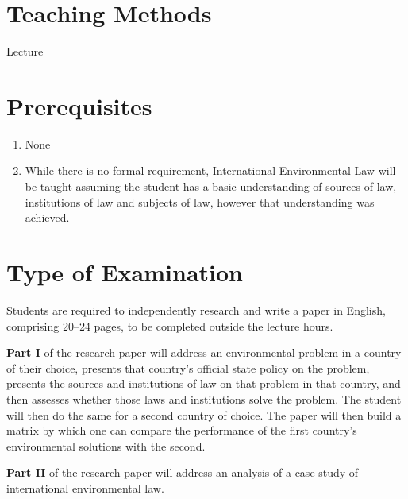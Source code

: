 \documentclass[
  letterpaper,
  10pt,
  openany]{book}
\providecommand{\tightlist}{%
  \setlength{\itemsep}{0pt}\setlength{\parskip}{0pt}}\usepackage{longtable,booktabs,array}
\begin{document}
\section*{Teaching Methods}\label{teaching-methods-2}


Lecture

\section*{Prerequisites}\label{prerequisites-2}


\begin{enumerate}
\def\labelenumi{\alph{enumi})}
\tightlist
\item
  None\\
\item
  While there is no formal requirement, International Environmental Law
  will be taught assuming the student has a basic understanding of
  sources of law, institutions of law and subjects of law, however that
  understanding was achieved.
\end{enumerate}

\section*{Type of Examination}\label{type-of-examination-2}


Students are required to independently research and write a paper in
English, comprising 20--24 pages, to be completed outside the lecture
hours.

\textbf{Part I} of the research paper will address an environmental
problem in a country of their choice, presents that country's official
state policy on the problem, presents the sources and institutions of
law on that problem in that country, and then assesses whether those
laws and institutions solve the problem. The student will then do the
same for a second country of choice. The paper will then build a matrix
by which one can compare the performance of the first country's
environmental solutions with the second.

\textbf{Part II} of the research paper will address an analysis of a
case study of international environmental law.
\end{document}
